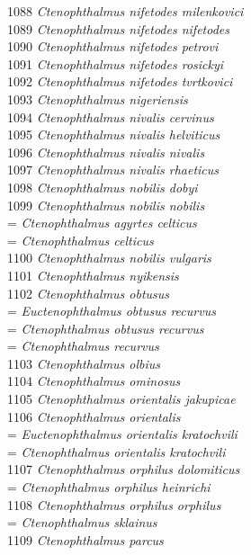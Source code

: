 \documentclass[
]{article}
\begin{document}
1088 \emph{Ctenophthalmus nifetodes milenkovici}\\
1089 \emph{Ctenophthalmus nifetodes nifetodes}\\
1090 \emph{Ctenophthalmus nifetodes petrovi}\\
1091 \emph{Ctenophthalmus nifetodes rosickyi}\\
1092 \emph{Ctenophthalmus nifetodes tvrtkovici}\\
1093 \emph{Ctenophthalmus nigeriensis}\\
1094 \emph{Ctenophthalmus nivalis cervinus}\\
1095 \emph{Ctenophthalmus nivalis helviticus}\\
1096 \emph{Ctenophthalmus nivalis nivalis}\\
1097 \emph{Ctenophthalmus nivalis rhaeticus}\\
1098 \emph{Ctenophthalmus nobilis dobyi}\\
1099 \emph{Ctenophthalmus nobilis nobilis}\\
= \emph{Ctenophthalmus agyrtes celticus}\\
= \emph{Ctenophthalmus celticus}\\
1100 \emph{Ctenophthalmus nobilis vulgaris}\\
1101 \emph{Ctenophthalmus nyikensis}\\
1102 \emph{Ctenophthalmus obtusus}\\
= \emph{Euctenophthalmus obtusus recurvus}\\
= \emph{Ctenophthalmus obtusus recurvus}\\
= \emph{Ctenophthalmus recurvus}\\
1103 \emph{Ctenophthalmus olbius}\\
1104 \emph{Ctenophthalmus ominosus}\\
1105 \emph{Ctenophthalmus orientalis jakupicae}\\
1106 \emph{Ctenophthalmus orientalis}\\
= \emph{Euctenophthalmus orientalis kratochvili}\\
= \emph{Ctenophthalmus orientalis kratochvili}\\
1107 \emph{Ctenophthalmus orphilus dolomiticus}\\
= \emph{Ctenophthalmus orphilus heinrichi}\\
1108 \emph{Ctenophthalmus orphilus orphilus}\\
= \emph{Ctenophthalmus sklainus}\\
1109 \emph{Ctenophthalmus parcus}\\
\end{document}
